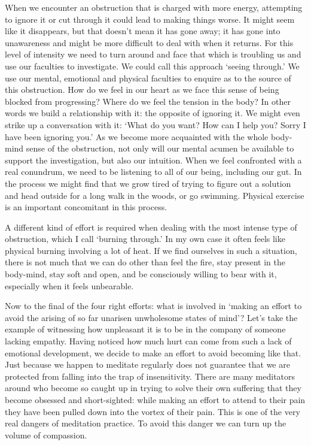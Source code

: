 When we encounter an obstruction that is charged with more energy,
attempting to ignore it or cut through it could lead to making things
worse. It might seem like it disappears, but that doesn't mean it has
gone away; it has gone into unawareness and might be more difficult to
deal with when it returns. For this level of intensity we need to turn
around and face that which is troubling us and use our faculties to
investigate. We could call this approach `seeing through.' We use our
mental, emotional and physical faculties to enquire as to the source of
this obstruction. How do we feel in our heart as we face this sense of
being blocked from progressing? Where do we feel the tension in the
body? In other words we build a relationship with it: the opposite of
ignoring it. We might even strike up a conversation with it: `What do
you want? How can I help you? Sorry I have been ignoring you.' As we
become more acquainted with the whole body-mind sense of the
obstruction, not only will our mental acumen be available to support the
investigation, but also our intuition. When we feel confronted with a
real conundrum, we need to be listening to all of our being, including
our gut. In the process we might find that we grow tired of trying to
figure out a solution and head outside for a long walk in the woods, or
go swimming. Physical exercise is an important concomitant in this
process.

A different kind of effort is required when dealing with the most
intense type of obstruction, which I call `burning through.' In my own
case it often feels like physical burning involving a lot of heat. If we
find ourselves in such a situation, there is not much that we can do
other than feel the fire, stay present in the body-mind, stay soft and
open, and be consciously willing to bear with it, especially when it
feels unbearable.

Now to the final of the four right efforts: what is involved in `making
an effort to avoid the arising of so far unarisen unwholesome states of
mind'? Let's take the example of witnessing how unpleasant it is to be
in the company of someone lacking empathy. Having noticed how much hurt
can come from such a lack of emotional development, we decide to make an
effort to avoid becoming like that. Just because we happen to meditate
regularly does not guarantee that we are protected from falling into the
trap of insensitivity. There are many meditators around who become so
caught up in trying to solve their own suffering that they become
obsessed and short-sighted: while making an effort to attend to their
pain they have been pulled down into the vortex of their pain. This is
one of the very real dangers of meditation practice. To avoid this
danger we can turn up the volume of compassion.


